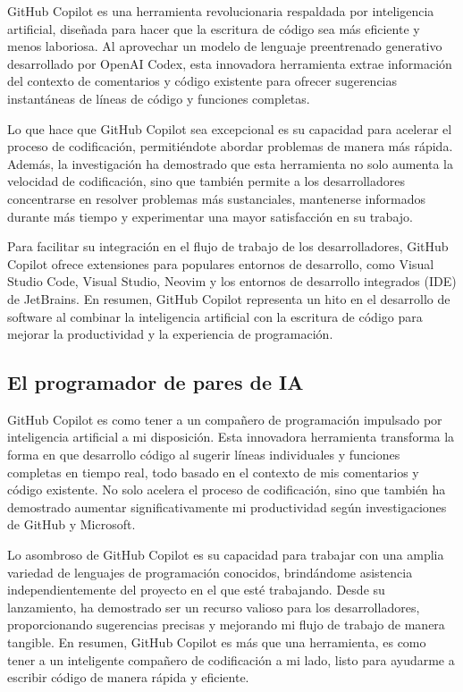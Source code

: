 GitHub Copilot es una herramienta revolucionaria respaldada por inteligencia artificial, diseñada 
para hacer que la escritura de código sea más eficiente y menos laboriosa. Al aprovechar un modelo 
de lenguaje preentrenado generativo desarrollado por OpenAI Codex, esta innovadora herramienta 
extrae información del contexto de comentarios y código existente para ofrecer sugerencias 
instantáneas de líneas de código y funciones completas.

Lo que hace que GitHub Copilot sea excepcional es su capacidad para acelerar el proceso de 
codificación, permitiéndote abordar problemas de manera más rápida. Además, la investigación ha 
demostrado que esta herramienta no solo aumenta la velocidad de codificación, sino que también 
permite a los desarrolladores concentrarse en resolver problemas más sustanciales, mantenerse 
informados durante más tiempo y experimentar una mayor satisfacción en su trabajo.

Para facilitar su integración en el flujo de trabajo de los desarrolladores, GitHub Copilot ofrece 
extensiones para populares entornos de desarrollo, como Visual Studio Code, Visual Studio, Neovim y 
los entornos de desarrollo integrados (IDE) de JetBrains. En resumen, GitHub Copilot representa un 
hito en el desarrollo de software al combinar la inteligencia artificial con la escritura de código 
para mejorar la productividad y la experiencia de programación.


\subsection{El programador de pares de IA}

GitHub Copilot es como tener a un compañero de programación impulsado por inteligencia artificial 
a mi disposición. Esta innovadora herramienta transforma la forma en que desarrollo código al 
sugerir líneas individuales y funciones completas en tiempo real, todo basado en el contexto de 
mis comentarios y código existente. No solo acelera el proceso de codificación, sino que también 
ha demostrado aumentar significativamente mi productividad según investigaciones de GitHub y Microsoft.


Lo asombroso de GitHub Copilot es su capacidad para trabajar con una amplia variedad de lenguajes 
de programación conocidos, brindándome asistencia independientemente del proyecto en el que esté 
trabajando. Desde su lanzamiento, ha demostrado ser un recurso valioso para los desarrolladores, 
proporcionando sugerencias precisas y mejorando mi flujo de trabajo de manera tangible. En resumen, 
GitHub Copilot es más que una herramienta, es como tener a un inteligente compañero de codificación 
a mi lado, listo para ayudarme a escribir código de manera rápida y eficiente.

